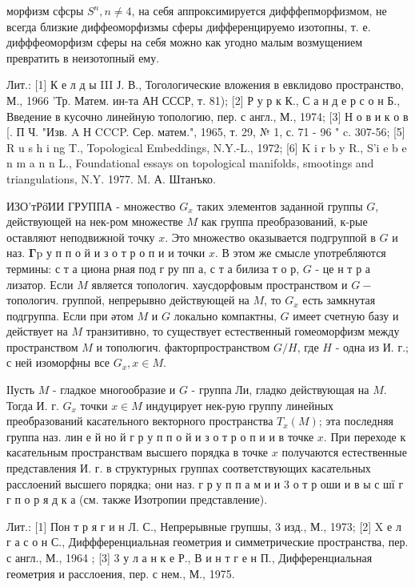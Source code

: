 \documentclass[10pt]{article}
\begin{document}
морфизм сфсры $S^{n}, n \neq 4$, на себя аппроксимируется дифффепморфизмом, не всегда близкие диффеоморфизмы сферы дифференцируемо изотопны, т. е. дифффеоморфизм сферы на себя можно как угодно малым возмущением превратить в неизотопный ему.



Лит.: [1] К е л д ы III Ј. В., Тогологические вложения в евклидово пространство, М., 1966 'Тр. Матем. ин-та АН СССР, т. 81); [2] Р у р к К., С а н д е р с о н Б., Введение в кусочно линейную топологию, пер. с англ., М., 1974; [3] Н о в и к о в [. П Ч. "Изв. A Н CCCP. Сер. матем.", 1965, т. 29, № 1, с. 71 - 96 " c. 307-56; [5] R u s h i ng T., Topological Embeddings, N.Y.-L., 1972; [6] K i r b y R., S'i e b e n m a n n L., Foundational essays on topological manifolds, smootings and triangulations, N.Y. 1977. M. А. Штанъко.



ИЗО’тРӧ̈ИИ ГРУППА - множество $G_{x}$ таких элементов заданной группы $G$, действующей на нек-ром множестве $M$ как группа преобразований, к-рые оставляют неподвижной точку $x$. Это множество оказывается подгруппой в $G$ и наз. $\boldsymbol{\Gamma} \mathrm{p}$ у п п о й и з о т р о п и и точки $x$. В этом же смысле употребляются термины: с т а циона рная под г ру пп а, с т а билиза т о р, $G$ - це н т р а лизатор. Если $M$ является топологич. хаусдорфовым пространством и $G-$ топологич. группой, непрерывно действующей на $M$, то $G_{x}$ есть замкнутая подгруппа. Если при әтом $M$ и $G$ локально компактны, $G$ имеет счетную базу и действует на $M$ транзитивно, то существует естественный гомеоморфизм между пространством $M$ и тополюгич. факторпространством $G / H$, где $H$ - одна из И. г.; с ней изоморфны все $G_{x}, x \in M$.



ІІусть $M$ - гладкое многообразие и $G$ - группа Ли, гладко действующая на $M$. Тогда И. г. $G_{x}$ точки $x \in M$ индуцирует нек-рую группу линейных преобразований касательного векторного пространства $T_{x}(M)$; эта последняя группа наз. лин е й но й г р у п п о й и з о т р о п и и в точке $x$. При переходе к касательным пространствам высшего порядка в точке $x$ получаются естественные представления И. г. в структурных группах соответствующих касательных расслоений высшего порядка; они наз. г р у п п а м и и 3 о т р оши и в ы с шї г г п о р я д к а (см. также Изотропии представление).



Лит.: [1] Пон т р я г и н Л. С., Непрерывные групшы, 3 изд., М., 1973; [2] X е л г а с о н С., Диффференциальная геометрия и симметрические пространства, пер. с англ., М., 1964 ; [3] 3 у л а н к е Р., В и н т г е н П., Дифференциальная геометрия и расслоения, пер. с нем., М., 1975.
\end{document}
